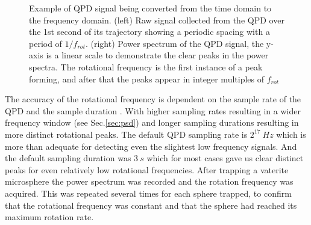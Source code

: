 \begin{figure}[h!]
\begin{subfigure}{0.49\linewidth}
	\end{subfigure}
	\caption{Example of QPD signal being converted from the time 
		domain to the frequency domain. (left) Raw signal collected
		from the QPD over the 1st second of its trajectory showing 
		a periodic spacing with a period of $1/f_{rot}$. (right) 
		Power spectrum of the QPD signal, the y-axis is a linear 
		scale to demonstrate the clear peaks in the power spectra. 
		The rotational frequency is the first instance of a peak 
		forming, and after that the peaks appear in integer 
		multiples of $f_{rot}$}
	\label{fig:tdat_fdat}
\end{figure}

The accuracy of the rotational frequency is dependent on the sample
rate of the QPD and the sample duration \cite{BergSoerensen2004}. 
With higher sampling rates resulting in a wider frequency window 
(see Sec.\ref{sec:psd}) and longer sampling durations resulting in 
more distinct rotational peaks. The default QPD sampling rate is 
$2^{17}\ Hz$ which is more than adequate for detecting even the 
slightest low frequency signals. And the default sampling duration 
was $3\ s$ which for most cases gave us clear distinct peaks for 
even relatively low rotational frequencies. After trapping a 
vaterite microsphere the power spectrum was recorded and the 
rotation frequency was acquired. This was repeated several times
for each sphere trapped, to confirm that the rotational frequency
was constant and that the sphere had reached its maximum rotation 
rate.
    
